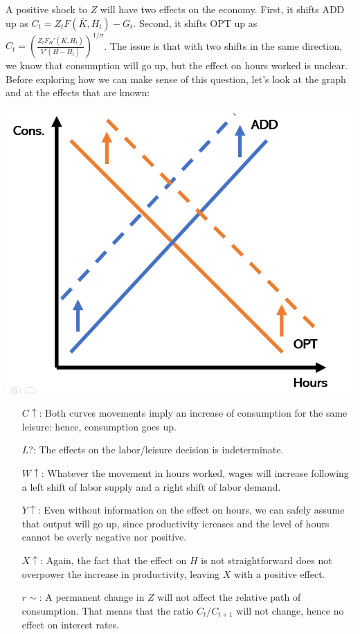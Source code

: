 \documentclass[12pt]{report}
\begin{document}
A positive shock to $Z$ will have two effects on the economy. First, it shifts ADD up as $C_t = Z_t F(\bar K, H_t) - G_t$. Second, it shifts OPT up as $C_t = \left(\frac{Z_t F_H'(\bar K, H_t)}{V'(\bar H - H_t)}\right)^{1/\sigma}$. The issue is that with two shifts in the same direction, we know that consumption will go up, but the effect on hours worked is unclear. Before exploring how we can make sense of this question, let's look at the graph and at the effects that are known:\begin{center}
 \includegraphics[scale=0.40]{images/RBC1-zshock.PNG}
\end{center}

\begin{itemize}
\item[$C\uparrow$:] Both curves movements imply an increase of consumption for the same leisure: hence, consumption goes up.
\item[$L$?:] The effects on the labor/leisure decision is indeterminate.
\item[$W\uparrow$:] Whatever the movement in hours worked, wages will increase following a left shift of labor supply and a right shift of labor demand.
\item[$Y\uparrow$:] Even without information on the effect on hours, we can safely assume that output will go up, since productivity icreases and the level of hours cannot be overly negative nor positive.
\item[$X\uparrow$:] Again, the fact that the effect on $H$ is not straightforward does not overpower the increase in productivity, leaving $X$ with a positive effect.
\item[$r\sim$:] A permanent change in $Z$ will not affect the relative path of consumption. That means that the ratio $C_t/C_{t+1}$ will not change, hence no effect on interest rates.
\end{itemize}
\end{document}
